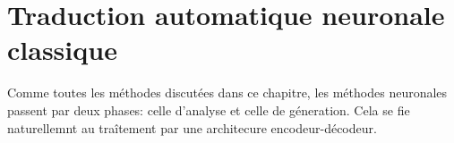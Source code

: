 \section{Traduction automatique neuronale classique}
\label{sec:nmt-classic}

Comme toutes les méthodes discutées dans ce chapitre, les méthodes neuronales passent par deux phases:
celle d'analyse et celle de géneration. 
Cela se fie naturellemnt au traîtement par une architecure encodeur-décodeur.
